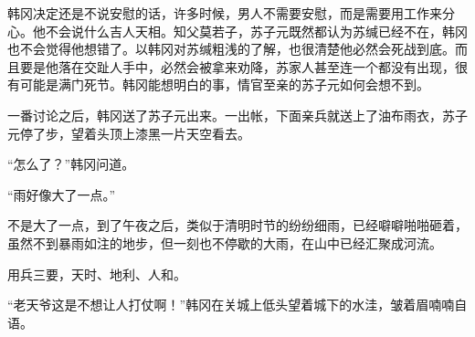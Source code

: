 韩冈决定还是不说安慰的话，许多时候，男人不需要安慰，而是需要用工作来分心。他不会说什么吉人天相。知父莫若子，苏子元既然都认为苏缄已经不在，韩冈也不会觉得他想错了。以韩冈对苏缄粗浅的了解，也很清楚他必然会死战到底。而且要是他落在交趾人手中，必然会被拿来劝降，苏家人甚至连一个都没有出现，很有可能是满门死节。韩冈能想明白的事，情官至亲的苏子元如何会想不到。

一番讨论之后，韩冈送了苏子元出来。一出帐，下面亲兵就送上了油布雨衣，苏子元停了步，望着头顶上漆黑一片天空看去。

“怎么了？”韩冈问道。

“雨好像大了一点。”

不是大了一点，到了午夜之后，类似于清明时节的纷纷细雨，已经噼噼啪啪砸着，虽然不到暴雨如注的地步，但一刻也不停歇的大雨，在山中已经汇聚成河流。

用兵三要，天时、地利、人和。

“老天爷这是不想让人打仗啊！”韩冈在关城上低头望着城下的水洼，皱着眉喃喃自语。

